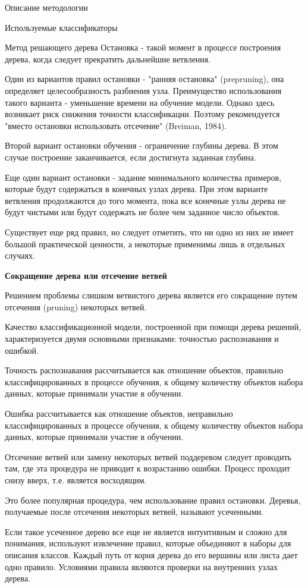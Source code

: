 \begin{section}{Описание методологии}
\begin{subsection}{Используемые классификаторы}
\begin{subsubsection}{Метод решающего дерева}
Остановка - такой момент в процессе построения дерева, когда следует прекратить дальнейшие ветвления.

Один из вариантов правил остановки - "ранняя остановка" (prepruning), она определяет целесообразность разбиения узла. Преимущество использования такого варианта - уменьшение времени на обучение модели. Однако здесь возникает риск снижения точности классификации. Поэтому рекомендуется "вместо остановки использовать отсечение" (Breiman, 1984).

Второй вариант остановки обучения - ограничение глубины дерева. В этом случае построение заканчивается, если достигнута заданная глубина.

Еще один вариант остановки - задание минимального количества примеров, которые будут содержаться в конечных узлах дерева. При этом варианте ветвления продолжаются до того момента, пока все конечные узлы дерева не будут чистыми или будут содержать не более чем заданное число объектов.

Существует еще ряд правил, но следует отметить, что ни одно из них не имеет большой практической ценности, а некоторые применимы лишь в отдельных случаях.

\textbf{Сокращение дерева или отсечение ветвей}

Решением проблемы слишком ветвистого дерева является его сокращение путем отсечения (pruning) некоторых ветвей.

Качество классификационной модели, построенной при помощи дерева решений, характеризуется двумя основными признаками: точностью распознавания и ошибкой.

Точность распознавания рассчитывается как отношение объектов, правильно классифицированных в процессе обучения, к общему количеству объектов набора данных, которые принимали участие в обучении.

Ошибка рассчитывается как отношение объектов, неправильно классифицированных в процессе обучения, к общему количеству объектов набора данных, которые принимали участие в обучении.

Отсечение ветвей или замену некоторых ветвей поддеревом следует проводить там, где эта процедура не приводит к возрастанию ошибки. Процесс проходит снизу вверх, т.е. является восходящим.

Это более популярная процедура, чем использование правил остановки. Деревья, получаемые после отсечения некоторых ветвей, называют усеченными.

Если такое усеченное дерево все еще не является интуитивным и сложно для понимания, используют извлечение правил, которые объединяют в наборы для описания классов. Каждый путь от корня дерева до его вершины или листа дает одно правило. Условиями правила являются проверки на внутренних узлах дерева.



\end{subsubsection}
\end{subsection}
\end{section}
